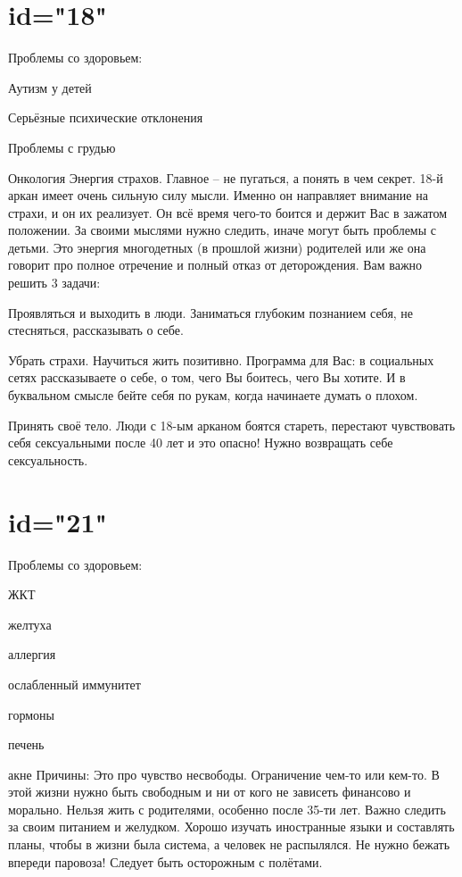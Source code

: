 \section{id="18"}{Проблемы со здоровьем:}
\item Аутизм у детей
\item Серьёзные психические отклонения
\item Проблемы с грудью
\item Онкология
Энергия страхов.
Главное – не пугаться, а понять в чем секрет. 18-й аркан имеет очень 
сильную силу мысли. Именно он направляет внимание на страхи, и он их 
реализует. Он всё время чего-то боится и держит Вас в зажатом положении. 
За своими мыслями нужно следить, иначе могут быть проблемы с детьми. 
Это энергия многодетных (в прошлой жизни) родителей или же она говорит 
про полное отречение и полный отказ от деторождения. 
Вам важно решить 3 задачи:
\item Проявляться и выходить в люди. Заниматься глубоким познанием себя, 
не стесняться, рассказывать о себе.
\item Убрать страхи. Научиться жить позитивно.
Программа для Вас: в социальных сетях рассказываете о себе, о том, 
чего Вы боитесь, чего Вы хотите. И в буквальном смысле бейте себя по 
рукам, когда начинаете думать о плохом.
\item Принять своё тело. Люди с 18-ым арканом боятся стареть, перестают 
чувствовать себя сексуальными после 40 лет и это опасно! Нужно возвращать 
себе сексуальность.
\endsection

\section{id="21"}{Проблемы со здоровьем:}
\item ЖКТ
\item желтуха
\item аллергия
\item ослабленный иммунитет
\item гормоны
\item печень
\item акне
Причины: Это про чувство несвободы. Ограничение чем-то или кем-то.
В этой жизни нужно быть свободным и ни от кого не зависеть финансово 
и морально. Нельзя жить с родителями, особенно после 35-ти лет. 
Важно следить за своим питанием и желудком. 
Хорошо изучать иностранные языки и составлять планы, чтобы в жизни 
была система, а человек не распылялся. Не нужно бежать впереди паровоза!
Следует быть осторожным с полётами.
\endsection
